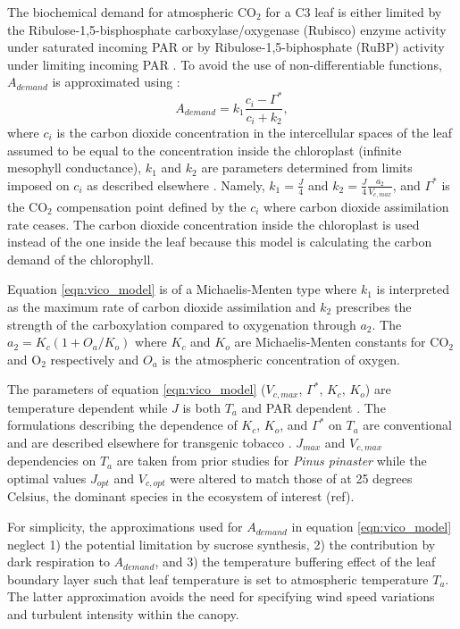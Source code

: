 \documentclass[utf8]{frontiersSCNS} %
\begin{document}
The biochemical demand for atmospheric CO$_2$ for a C3 leaf is either limited by the Ribulose-1,5-bisphosphate carboxylase/oxygenase (Rubisco) enzyme activity under saturated incoming PAR or by Ribulose-1,5-biphosphate (RuBP) activity under limiting incoming PAR \citep{farquhar_biochemical_1980}. To avoid the use of non-differentiable functions, $A_{demand}$ is approximated using \citep{vico_perspective_2013}:
\begin{equation}
    \label{eqn:vico_model}
    A_{demand} = k_1 \frac{c_i - \Gamma^*}{c_i + k_2},
\end{equation}
where $c_i$ is the carbon dioxide concentration in the intercellular spaces of the leaf assumed to be equal to the concentration inside the chloroplast (infinite mesophyll conductance), $k_1$ and $k_2$ are parameters determined from limits imposed on $c_i$ as described elsewhere \citep{vico_perspective_2013}. Namely, $k_1 = \frac{J}{4}$ and $k_2 = \frac{J}{4} \frac{a_2}{V_{c,max}}$, and $\Gamma^*$ is the CO$_2$ compensation point defined by the $c_i$ where carbon dioxide assimilation rate ceases. The carbon dioxide concentration inside the chloroplast is used instead of the one inside the leaf because this model is calculating the carbon demand of the chlorophyll.

Equation \ref{eqn:vico_model} is of a Michaelis-Menten type where $k_1$ is interpreted as the maximum rate of carbon dioxide assimilation and $k_2$ prescribes the strength of the carboxylation compared to oxygenation through $a_2$. The $a_2 = K_c (1+O_a/K_o)$ where $K_c$ and $K_o$ are Michaelis-Menten constants for CO$_2$ and O$_2$ respectively and $O_a$ is the atmospheric concentration of oxygen.

The parameters of equation \ref{eqn:vico_model} ($V_{c,max}$, $\Gamma^*$, $K_c$, $K_o$) are temperature dependent while $J$ is both $T_a$ and PAR dependent \citep{medlyn_temperature_2002}. The formulations describing the dependence of $K_c$, $K_o$, and $\Gamma^*$ on $T_a$ are conventional and are described elsewhere for transgenic tobacco \citep{bernacchi_improved_2001}. $J_{max}$ and $V_{c,max}$ dependencies on $T_a$ are taken from prior studies for \textit{Pinus pinaster} \citep{medlyn_temperature_2002} while the optimal values $J_{opt}$ and $V_{c,opt}$ were altered to match those of  at 25 degrees Celsius, the dominant species in the ecosystem of interest (ref).

For simplicity, the approximations used for $A_{demand}$ in equation \ref{eqn:vico_model} neglect 1) the potential limitation by sucrose synthesis, 2) the contribution by dark respiration to $A_{demand}$, and 3) the temperature buffering effect of the leaf boundary layer such that leaf temperature is set to atmospheric temperature $T_a$.  The latter approximation avoids the need for specifying wind speed variations and turbulent intensity within the canopy.
\end{document}
